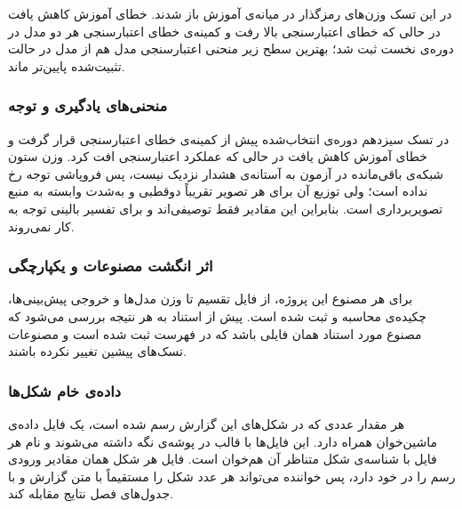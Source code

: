در این تسک وزن‌های رمزگذار در میانه‌ی آموزش باز شدند. خطای آموزش کاهش یافت در حالی که خطای اعتبارسنجی بالا رفت و کمینه‌ی خطای اعتبارسنجی هر دو مدل در دوره‌ی نخست ثبت شد؛ بهترین سطح زیر منحنی اعتبارسنجی مدل  هم از مدل  در حالت تثبیت‌شده پایین‌تر ماند.

\subsubsection{منحنی‌های یادگیری و توجه }





در تسک سیزدهم دوره‌ی انتخاب‌شده پیش از کمینه‌ی خطای اعتبارسنجی قرار گرفت و خطای آموزش کاهش یافت در حالی که عملکرد اعتبارسنجی افت کرد. وزن ستون شبکه‌ی باقی‌مانده در آزمون به آستانه‌ی هشدار نزدیک نیست، پس فروپاشی توجه رخ نداده است؛ ولی توزیع آن برای هر تصویر تقریباً دوقطبی و به‌شدت وابسته به منبع تصویربرداری است. بنابراین این مقادیر فقط توصیفی‌اند و برای تفسیر بالینی توجه به کار نمی‌روند.

\subsubsection{اثر انگشت مصنوعات و یکپارچگی}

برای هر مصنوع این پروژه، از فایل تقسیم تا وزن مدل‌ها و خروجی پیش‌بینی‌ها، چکیده‌ی  محاسبه و ثبت شده است. پیش از استناد به هر نتیجه بررسی می‌شود که مصنوع مورد استناد همان فایلی باشد که در فهرست ثبت شده است و مصنوعات تسک‌های پیشین تغییر نکرده باشند.

\subsubsection{داده‌ی خام شکل‌ها}

هر مقدار عددی که در شکل‌های این گزارش رسم شده است، یک فایل داده‌ی ماشین‌خوان همراه دارد. این فایل‌ها با قالب  در پوشه‌ی  نگه داشته می‌شوند و نام هر فایل با شناسه‌ی شکل متناظر آن هم‌خوان است. فایل هر شکل همان مقادیر ورودی رسم را در خود دارد، پس خواننده می‌تواند هر عدد شکل را مستقیماً با متن گزارش و با جدول‌های فصل نتایج مقابله کند.
